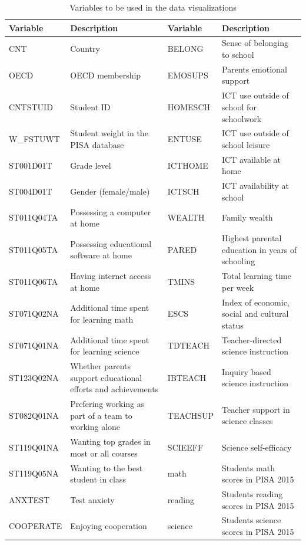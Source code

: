 \documentclass[]{book}
\begin{document}
\begin{table}

\caption{\label{tab:tab1}Variables to be used in the data visualizations}
\centering
\begin{tabular}[t]{l|l|l|l}
\hline
Variable & Description & Variable & Description\\
\hline
CNT & Country & BELONG & Sense of belonging to school\\
\hline
OECD & OECD membership & EMOSUPS & Parents emotional support\\
\hline
CNTSTUID & Student ID & HOMESCH & ICT use outside of school for schoolwork\\
\hline
W\_FSTUWT & Student weight in the PISA database & ENTUSE & ICT use outside of school leisure\\
\hline
ST001D01T & Grade level & ICTHOME & ICT available at home\\
\hline
ST004D01T & Gender (female/male) & ICTSCH & ICT availability at school\\
\hline
ST011Q04TA & Possessing a computer at home & WEALTH & Family wealth\\
\hline
ST011Q05TA & Possessing educational software at home & PARED & Highest parental education in years of schooling\\
\hline
ST011Q06TA & Having internet access at home & TMINS & Total learning time per week\\
\hline
ST071Q02NA & Additional time spent for learning math & ESCS & Index of economic, social and cultural status\\
\hline
ST071Q01NA & Additional time spent for learning science & TDTEACH & Teacher-directed science instruction\\
\hline
ST123Q02NA & Whether parents support educational efforts and achievements & IBTEACH & Inquiry based science instruction\\
\hline
ST082Q01NA & Prefering working as part of a team to working alone & TEACHSUP & Teacher support in science classes\\
\hline
ST119Q01NA & Wanting top grades in most or all courses & SCIEEFF & Science self-efficacy\\
\hline
ST119Q05NA & Wanting to the best student in class & math & Students math scores in PISA 2015\\
\hline
ANXTEST & Test anxiety & reading & Students reading scores in PISA 2015\\
\hline
COOPERATE & Enjoying cooperation & science & Students science scores in PISA 2015\\
\hline
\end{tabular}
\end{table}
\end{document}
